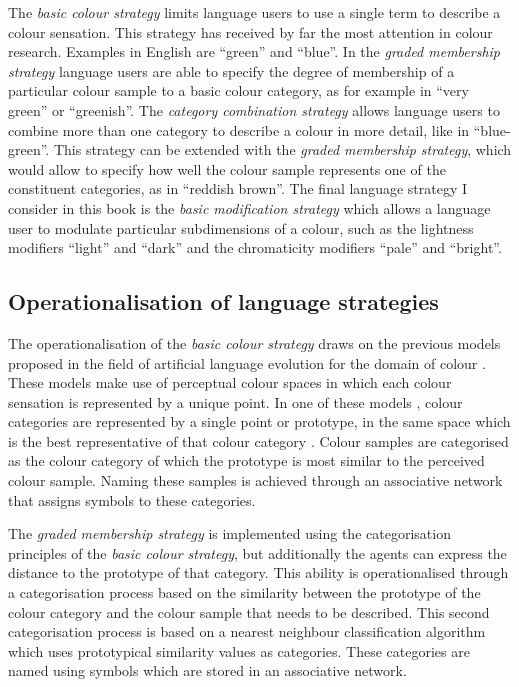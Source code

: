 The \emph{basic colour strategy} limits language users to use a single
term to describe a colour sensation. This strategy has received by far
the most attention in colour research. Examples in English are
``green'' and ``blue''. In the \emph{graded membership strategy}
language users are able to specify the degree of membership of a
particular colour sample to a basic colour category, as for example in
``very green'' or ``greenish''. The \emph{category combination
  strategy} allows language users to combine more than one category to
describe a colour in more detail, like in ``blue-green''. This
strategy can be extended with the \emph{graded membership strategy},
which would allow to specify how well the colour sample represents one
of the constituent categories, as in ``reddish brown''. The final
language strategy I consider in this book is the \emph{basic
  modification strategy} which allows a language user to modulate
particular subdimensions of a colour, such as the lightness modifiers
``light'' and ``dark'' and the chromaticity modifiers ``pale'' and
``bright''.

\subsection{Operationalisation of language strategies}

The operationalisation of the \emph{basic colour strategy} draws on
the previous models proposed in the field of artificial language
evolution for the domain of colour \citep{steels05coordinating}. These
models make use of perceptual colour spaces in which each colour
sensation is represented by a unique point. In one of these models
\citep{belpaeme05explaining}, colour categories are represented by a
single point or prototype, in the same space which is the best
representative of that colour category \citep{rosch73natural}. Colour
samples are categorised as the colour category of which the prototype
is most similar to the perceived colour sample. Naming these samples
is achieved through an associative network that assigns symbols to
these categories.

The \emph{graded membership strategy} is implemented using the
categorisation principles of the \emph{basic colour strategy}, but
additionally the agents can express the distance to the prototype of
that category. This ability is operationalised through a
categorisation process based on the similarity between the prototype
of the colour category and the colour sample that needs to be
described. This second categorisation process is based on a nearest
neighbour classification algorithm which uses prototypical similarity
values as categories. These categories are named using symbols which
are stored in an associative network.

